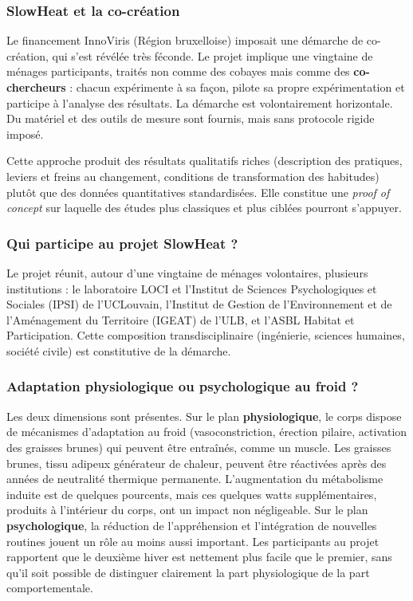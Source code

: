 \subsubsection{SlowHeat et la co-création}

Le financement InnoViris (Région bruxelloise) imposait une démarche de co-création, qui s'est révélée très féconde. Le projet implique une vingtaine de ménages participants, traités non comme des cobayes mais comme des \textbf{co-chercheurs} : chacun expérimente à sa façon, pilote sa propre expérimentation et participe à l'analyse des résultats. La démarche est volontairement horizontale. Du matériel et des outils de mesure sont fournis, mais sans protocole rigide imposé.

Cette approche produit des résultats qualitatifs riches (description des pratiques, leviers et freins au changement, conditions de transformation des habitudes) plutôt que des données quantitatives standardisées. Elle constitue une \textit{proof of concept} sur laquelle des études plus classiques et plus ciblées pourront s'appuyer.

\subsubsection{Qui participe au projet SlowHeat ?}

Le projet réunit, autour d'une vingtaine de ménages volontaires, plusieurs institutions : le laboratoire LOCI et l'Institut de Sciences Psychologiques et Sociales (IPSI) de l'UCLouvain, l'Institut de Gestion de l'Environnement et de l'Aménagement du Territoire (IGEAT) de l'ULB, et l'ASBL Habitat et Participation. Cette composition transdisciplinaire (ingénierie, sciences humaines, société civile) est constitutive de la démarche.

\subsubsection{Adaptation physiologique ou psychologique au froid ?}

Les deux dimensions sont présentes. Sur le plan \textbf{physiologique}, le corps dispose de mécanismes d'adaptation au froid (vasoconstriction, érection pilaire, activation des graisses brunes) qui peuvent être entraînés, comme un muscle. Les graisses brunes, tissu adipeux générateur de chaleur, peuvent être réactivées après des années de neutralité thermique permanente. L'augmentation du métabolisme induite est de quelques pourcents, mais ces quelques watts supplémentaires, produits à l'intérieur du corps, ont un impact non négligeable. Sur le plan \textbf{psychologique}, la réduction de l'appréhension et l'intégration de nouvelles routines jouent un rôle au moins aussi important. Les participants au projet rapportent que le deuxième hiver est nettement plus facile que le premier, sans qu'il soit possible de distinguer clairement la part physiologique de la part comportementale.

